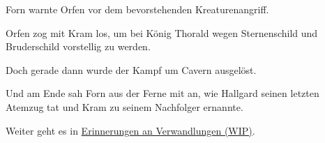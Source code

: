 \trennzeichen


Forn warnte Orfen vor dem bevorstehenden Kreaturenangriff.

Orfen zog mit Kram los, um bei König Thorald wegen Sternenschild und Bruderschild vorstellig zu werden.

Doch gerade dann wurde der Kampf um Cavern ausgelöst.



Und am Ende sah Forn aus der Ferne mit an, wie Hallgard seinen letzten Atemzug tat und Kram zu seinem Nachfolger ernannte.










\begin{commentbox}
    Weiter geht es in \hyperref[wip-erinnerungen-an-verwandlungen]{Erinnerungen an Verwandlungen (WIP)}.
\end{commentbox}